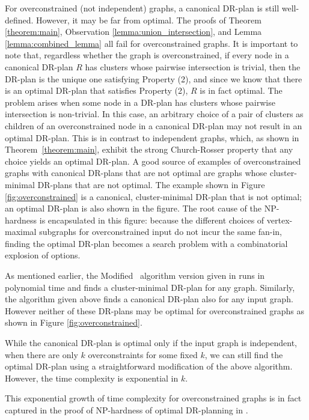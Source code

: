 For overconstrained (not independent) graphs, a canonical DR-plan is still well-defined.
However, it may be far from optimal. The proofs of Theorem \ref{theorem:main}, Observation \ref{lemma:union_intersection}, and Lemma \ref{lemma:combined_lemma} all fail for overconstrained graphs.
It is important to note that, regardless whether the graph is overconstrained, if every node in a canonical DR-plan $R$ has clusters whose pairwise intersection is trivial, then the DR-plan is the unique one satisfying Property (2), and since we know that there is an optimal DR-plan that satisfies Property (2), $R$ is in fact optimal. The problem arises when some node in a DR-plan has clusters whose pairwise intersection is non-trivial.
In this case, an arbitrary choice of a pair of clusters as children of an overconstrained node in a canonical DR-plan may not result in an optimal DR-plan. This is in contrast to independent graphs, which, as shown in Theorem~\ref{theorem:main}, exhibit the strong Church-Rosser property that any choice yields an optimal DR-plan.
A good source of examples of overconstrained graphs with canonical DR-plans that are not optimal are graphs whose cluster-minimal DR-plans that are not optimal. The example shown in Figure \ref{fig:overconstrained} is a canonical, cluster-minimal DR-plan that is not optimal; an optimal DR-plan is also shown in the figure.
The root cause of the NP-hardness is encapsulated in this figure: because the different choices of vertex-maximal subgraphs for overconstrained input do not incur the same fan-in, finding the optimal DR-plan becomes a search problem with a combinatorial explosion of options.


As mentioned earlier, the Modified \frontier\ algorithm
version given in \cite{lomonosov2004graph} runs in polynomial time and finds a cluster-minimal DR-plan for any graph.
Similarly, the algorithm given above finds a canonical DR-plan also for any input graph.  However neither of these DR-plans may be optimal for overconstrained graphs as shown in Figure \ref{fig:overconstrained}.

While the canonical DR-plan is optimal only if the input graph is independent, when there are only $k$ overconstraints for some fixed $k$, we can still find the optimal DR-plan using a straightforward modification of the above algorithm. However, the time complexity is exponential in $k$.

This exponential growth of time complexity for overconstrained graphs is in fact captured in the proof of NP-hardness of optimal DR-planning in \cite{sitharam2005combinatorial, lomonosov2004graph}.

